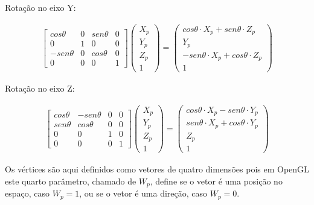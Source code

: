 {Rotação no eixo Y:

\begin{align}
\left[\begin{array}{cccc}
cos\theta & 0 & sen\theta & 0\\
0 & 1 & 0 & 0\\
-sen\theta & 0 & cos\theta & 0\\
0 & 0 & 0 & 1
\end{array}\right]
\left(\begin{array}{c}
X_p\\
Y_p\\
Z_p\\
1
\end{array}\right) =
\left(\begin{array}{c}
cos\theta \cdot X_p + sen\theta \cdot Z_p\\
Y_p\\
-sen\theta \cdot X_p + cos\theta \cdot Z_p\\
1
\end{array}\right)
\label{eq:rend_rotationMatY}
\end{align}

Rotação no eixo Z:

\begin{align}
\left[\begin{array}{cccc}
cos\theta & -sen\theta & 0 & 0\\
sen\theta & cos\theta & 0 & 0\\
0 & 0 & 1 & 0\\
0 & 0 & 0 & 1
\end{array}\right]
\left(\begin{array}{c}
X_p\\
Y_p\\
Z_p\\
1
\end{array}\right) =
\left(\begin{array}{c}
cos\theta \cdot X_p - sen\theta \cdot Y_p\\
sen\theta \cdot X_p + cos\theta \cdot Y_p\\
Z_p\\
1
\end{array}\right)
\label{eq:rend_rotationMatZ}
\end{align}


Os vértices são aqui definidos como vetores de quatro dimensões pois em OpenGL este quarto parâmetro, chamado de $W_p$, define se o vetor é uma posição no espaço, caso $W_p = 1$, ou se o vetor é uma direção, caso $W_p = 0$.

}
